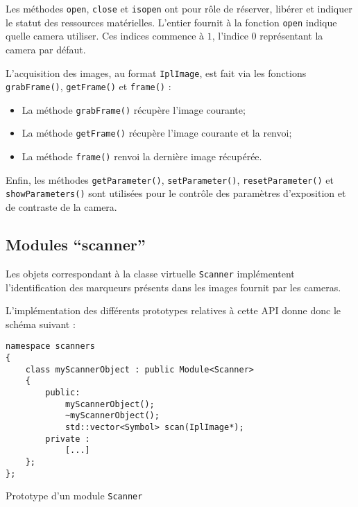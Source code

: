 \documentclass[10pt,a4paper,twoside, twocolumn]{report}
\begin{document}
Les méthodes \texttt{open}, \texttt{close} et \texttt{isopen} ont pour rôle de réserver, libérer et indiquer le statut des ressources matérielles. L’entier fournit à la fonction \texttt{open} indique quelle camera utiliser. Ces indices commence à $1$, l’indice $0$ représentant la camera par défaut.

L’acquisition des images, au format \texttt{IplImage}, est fait via les fonctions \texttt{grabFrame()}, \texttt{getFrame()} et \texttt{frame()} :
\begin{itemize}
	\item La méthode \texttt{grabFrame()} récupère l’image courante;
	\item La méthode \texttt{getFrame()} récupère l’image courante et la renvoi;
	\item La méthode \texttt{frame()} renvoi la dernière image récupérée.
\end{itemize}

Enfin, les méthodes \texttt{getParameter()}, \texttt{setParameter()}, \texttt{resetParameter()} et \texttt{showParameters()} sont utilisées pour le contrôle des paramètres d'exposition et de contraste de la camera.



\subsection{Modules “scanner”}\label{section:module:scanner}

Les objets correspondant à la classe virtuelle \texttt{Scanner} implémentent l’identification des marqueurs présents dans les images fournit par les cameras.

L’implémentation des différents prototypes relatives à cette API donne donc le schéma suivant :


\begin{code}[ht!]\centering
	\begin{lstlisting}
namespace scanners
{
	class myScannerObject : public Module<Scanner>
	{
		public:
			myScannerObject();
			~myScannerObject();
			std::vector<Symbol>	scan(IplImage*);
		private :
			[...]
	};
};
	\end{lstlisting}
	\caption{Prototype d’un module \texttt{Scanner}}
\end{code}
\end{document}
